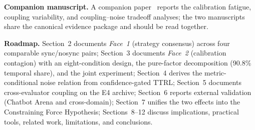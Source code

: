 \documentclass[11pt]{article}
\begin{document}
\noindent\textbf{Companion manuscript.} A companion paper~\citep{companioncal2026} reports the calibration fatigue, coupling variability, and coupling--noise tradeoff analyses; the two manuscripts share the canonical evidence package and should be read together.

\noindent\textbf{Roadmap.} Section~2 documents \textit{Face~1} (strategy consensus) across four comparable sync/nosync pairs; Section~3 documents \textit{Face~2} (calibration contagion) with an eight-condition design, the pure-factor decomposition (90.8\% temporal share), and the joint experiment; Section~4 derives the metric-conditional noise relation from confidence-gated TTRL; Section~5 documents cross-evaluator coupling on the E4 archive; Section~6 reports external validation (Chatbot Arena and cross-domain); Section~7 unifies the two effects into the Constraining Force Hypothesis; Sections~8--12 discuss implications, practical tools, related work, limitations, and conclusions.
\end{document}
